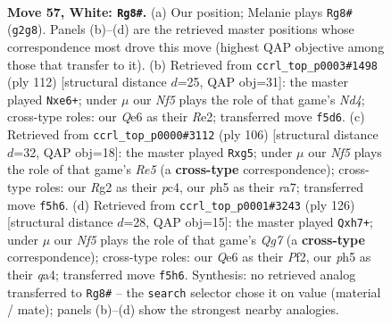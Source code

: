 \documentclass[11pt]{article}
\begin{document}
\clearpage

\begin{figure}[p]\centering
\begin{subfigure}{0.46\textwidth}\centering
\resizebox{\linewidth}{!}{%
\newchessgame
\chessboard[
  setfen={5k2/1p6/4Q2p/5N1p/8/8/6R1/6K1 w - - 0 57},
  showmover=false,
  pgfstyle=straightmove, color=movearrow, markmove={g2-g8}
]}
\caption{}
\end{subfigure}\hfill
\begin{subfigure}{0.46\textwidth}\centering
\resizebox{\linewidth}{!}{%
\newchessgame
\chessboard[
  setfen={8/8/1r1pp1p1/8/2KN1k2/8/4R3/8 w - - 2 57},
  showmover=false,
  pgfstyle=straightmove, color=movearrow, markmove={d4-e6}
]}
\caption{}
\end{subfigure}
\\[4pt]
\begin{subfigure}{0.46\textwidth}\centering
\resizebox{\linewidth}{!}{%
\newchessgame
\chessboard[
  setfen={8/r7/2k5/4R1p1/2p1K3/8/8/8 w - - 1 54},
  showmover=false,
  pgfstyle=straightmove, color=movearrow, markmove={e5-g5}
]}
\caption{}
\end{subfigure}\hfill
\begin{subfigure}{0.46\textwidth}\centering
\resizebox{\linewidth}{!}{%
\newchessgame
\chessboard[
  setfen={8/6Qp/5p2/5P1k/q7/8/5PK1/8 w - - 0 64},
  showmover=false,
  pgfstyle=straightmove, color=movearrow, markmove={g7-h7}
]}
\caption{}
\end{subfigure}
\caption{\textbf{Move 57, White: \texttt{Rg8\#}.} (a) Our position; Melanie plays \texttt{Rg8\#} (\texttt{g2g8}). Panels (b)--(d) are the retrieved master positions whose correspondence most drove this move (highest QAP objective among those that transfer to it). (b) Retrieved from \texttt{ccrl\_top\_p0003\#1498} (ply 112) [structural distance $d$=25, QAP obj=31]: the master played \texttt{Nxe6+}; under $\mu$ our \emph{Nf5} plays the role of that game's \emph{Nd4}; cross-type roles: our \emph{Q}e6 as their \emph{R}e2; transferred move \texttt{f5d6}. (c) Retrieved from \texttt{ccrl\_top\_p0000\#3112} (ply 106) [structural distance $d$=32, QAP obj=18]: the master played \texttt{Rxg5}; under $\mu$ our \emph{Nf5} plays the role of that game's \emph{Re5} (a \textbf{cross-type} correspondence); cross-type roles: our \emph{R}g2 as their \emph{p}c4, our \emph{p}h5 as their \emph{r}a7; transferred move \texttt{f5h6}. (d) Retrieved from \texttt{ccrl\_top\_p0001\#3243} (ply 126) [structural distance $d$=28, QAP obj=15]: the master played \texttt{Qxh7+}; under $\mu$ our \emph{Nf5} plays the role of that game's \emph{Qg7} (a \textbf{cross-type} correspondence); cross-type roles: our \emph{Q}e6 as their \emph{P}f2, our \emph{p}h5 as their \emph{q}a4; transferred move \texttt{f5h6}. Synthesis: no retrieved analog transferred to \texttt{Rg8\#} -- the \texttt{search} selector chose it on value (material / mate); panels (b)--(d) show the strongest nearby analogies.}
\label{fig:thought-m112}
\end{figure}
\end{document}
